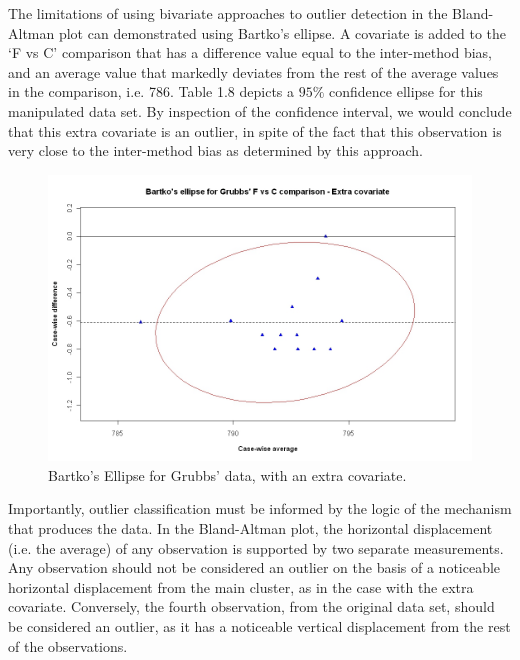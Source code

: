 \documentclass[12pt, a4paper]{report}
\theoremstyle{plain}
\theoremstyle{definition}
\theoremstyle{remark}
\begin{document}
	The limitations of using bivariate approaches to outlier detection
	in the Bland-Altman plot can demonstrated using Bartko's ellipse.
	A covariate is added to the `F vs C' comparison that has a
	difference value equal to the inter-method bias, and an average
	value that markedly deviates from the rest of the average values
	in the comparison, i.e. 786. Table 1.8 depicts a $95\%$ confidence
	ellipse for this manipulated data set. By inspection of the
	confidence interval, we would conclude that this extra
	covariate is an outlier, in spite of the fact that this
	observation is very close to the inter-method bias as determined by this approach.
	
	\begin{figure}[h!]
		\includegraphics[width=130mm]{images/GrubbsBartko2.jpeg}
		\caption{Bartko's Ellipse for Grubbs' data, with an extra covariate.}\label{GrubbsBartko2}
	\end{figure}
	
	
	Importantly, outlier classification must be informed by the logic of the
	mechanism that produces the data. In the Bland-Altman plot, the horizontal displacement (i.e. the average) of any
	observation is supported by two separate measurements. Any
	observation should not be considered an outlier on the basis of a
	noticeable horizontal displacement from the main cluster, as in
	the case with the extra covariate. Conversely, the fourth
	observation, from the original data set, should be considered an
	outlier, as it has a noticeable vertical displacement from the
	rest of the observations.
	
	
\end{document}
